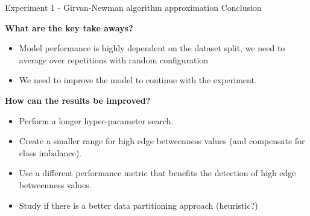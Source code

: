 \documentclass[xcolor=table]{beamer}
\begin{document}
\begin{frame}{Experiment 1 - Girvan-Newman algorithm approximation }{ Conclusion}


\textbf{What are the key take aways?}
\begin{itemize}
    \item Model performance is highly dependent on the dataset split, we need to average over repetitions with random configuration
    \item We need to improve the model to continue with the experiment.
\end{itemize}

\textbf{How can the results be improved?}
\begin{itemize}
    \item Perform a longer hyper-parameter search.
    \item Create a smaller range for high edge betweenness values (and compensate for class imbalance).
    \item Use a different performance metric that benefits the detection of high edge betweenness values.
    \item Study if there is a better data partitioning approach (heuristic?) 
    
\end{itemize}
\end{frame}









\end{document}
